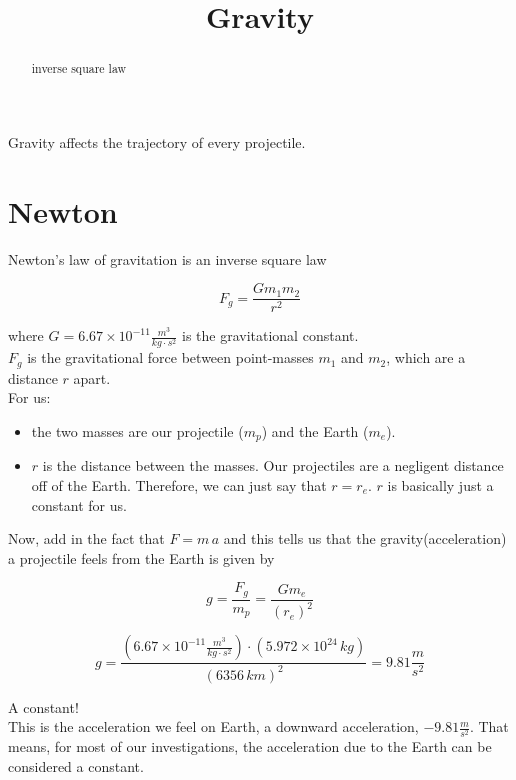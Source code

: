 \documentclass{ximera}
\title{Gravity}
\begin{document}
\begin{abstract}
inverse square law
\end{abstract}
\maketitle




Gravity affects the trajectory of every projectile.




\section{Newton}

Newton's law of gravitation is an inverse square law

\[ F_g = \frac{G m_1 m_2}{r^2}    \]




where $G = 6.67 \times 10^{-11} \frac{m^3}{kg \cdot s^2}$ is the gravitational constant. \\


$F_g$ is the gravitational force between point-masses $m_1$ and $m_2$, which are a distance $r$ apart. \\


For us:
\begin{itemize}
\item the two masses are our projectile ($m_p$) and the Earth ($m_e$).
\item $r$ is the distance between the masses. Our projectiles are a negligent distance off of the Earth.  Therefore, we can just say that $r = r_e$.  $r$ is basically just a constant for us.
\end{itemize}



Now, add in the fact that $F = m \, a$ and this tells us that the gravity(acceleration) a projectile feels from the Earth is given by


\[ g = \frac{F_g}{m_p}  = \frac{G m_e}{(r_e)^2}    \]


\[ g = \frac{(6.67 \times 10^{-11} \frac{m^3}{kg \cdot s^2}) \cdot (5.972 \times 10^{24} \, kg)}{(6356 \, km)^2} = 9.81 \frac{m}{s^2}   \]


A constant! \\

This is the acceleration we feel on Earth, a downward acceleration, $-9.81 \frac{m}{s^2}$.   That means, for most of our investigations, the acceleration due to the Earth can be considered a constant.
\end{document}
